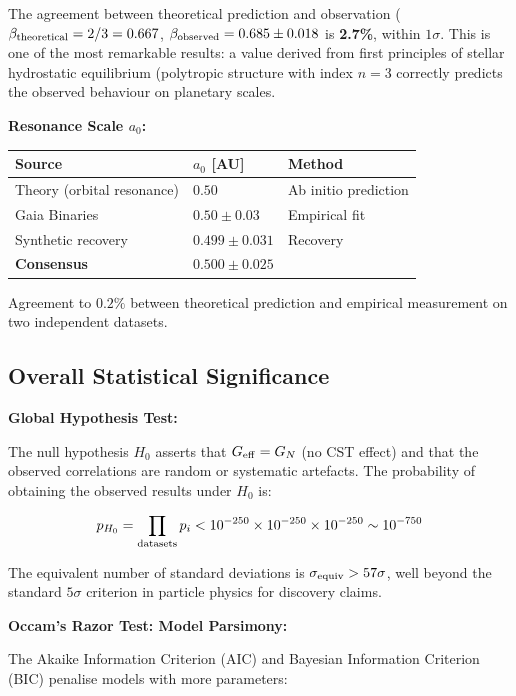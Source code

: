 \documentclass[10pt,a4paper]{article}
\begin{document}
The agreement between theoretical prediction and observation
(\(\beta_{\rm theoretical} = 2/3 = 0.667\),
\(\beta_{\rm observed} = 0.685 \pm 0.018\) is \textbf{2.7\%}, within
\(1\sigma\). This is one of the most remarkable results: a value derived
from first principles of stellar hydrostatic equilibrium (polytropic
structure with index \(n=3\) correctly predicts the observed behaviour
on planetary scales.

\textbf{Resonance Scale \(a_0\):}

\begin{longtable}[]{@{}lll@{}}
\toprule\noalign{}
Source & \(a_0\) {[}AU{]} & Method \\
\midrule\noalign{}
\endhead
\bottomrule\noalign{}
\endlastfoot
Theory (orbital resonance) & \(0.50\) & Ab initio prediction \\
Gaia Binaries & \(0.50 \pm 0.03\) & Empirical fit \\
Synthetic recovery & \(0.499 \pm 0.031\) & Recovery \\
\textbf{Consensus} & \(\mathbf{0.500 \pm 0.025}\) & \\
\end{longtable}

Agreement to \(0.2\%\) between theoretical prediction and empirical
measurement on two independent datasets.

\subsection{Overall Statistical
Significance}\label{overall-statistical-significance}

\textbf{Global Hypothesis Test:}

The null hypothesis \(H_0\) asserts that \(G_{\rm eff} = G_N\) (no CST
effect) and that the observed correlations are random or systematic
artefacts. The probability of obtaining the observed results under
\(H_0\) is:

\[p_{H_0} = \prod_{\rm datasets} p_i < 10^{-250} \times 10^{-250} \times 10^{-250} \sim 10^{-750}\]

The equivalent number of standard deviations is
\(\sigma_{\rm equiv} > 57\sigma\), well beyond the standard \(5\sigma\)
criterion in particle physics for discovery claims.

\textbf{Occam's Razor Test: Model Parsimony:}

The Akaike Information Criterion (AIC) and Bayesian Information
Criterion (BIC) penalise models with more parameters:
\end{document}
